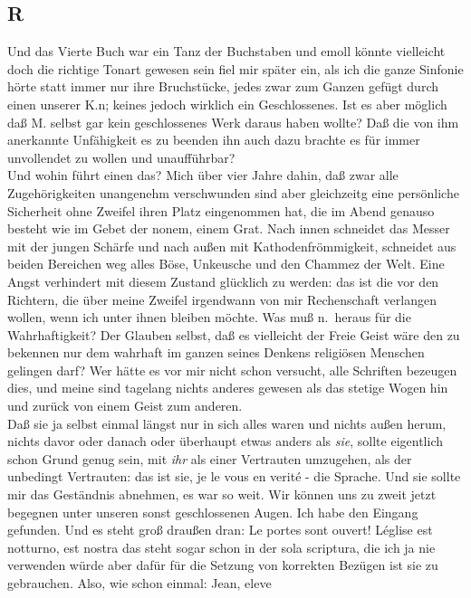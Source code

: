 \documentclass[
]{article}
\author{}
\date{\vspace{-2.5em}}
\begin{document}
\subsection{R}\label{r}

Und das Vierte Buch war ein Tanz der Buchstaben und emoll könnte
vielleicht doch die richtige Tonart gewesen sein fiel mir später ein,
als ich die ganze Sinfonie hörte statt immer nur ihre Bruchstücke, jedes
zwar zum Ganzen gefügt durch einen unserer K.n; keines jedoch wirklich
ein Geschlossenes. Ist es aber möglich daß M. selbst gar kein
geschlossenes Werk daraus haben wollte? Daß die von ihm anerkannte
Unfähigkeit es zu beenden ihn auch dazu brachte es für immer unvollendet
zu wollen und unaufführbar?\\
Und wohin führt einen das? Mich über vier Jahre dahin, daß zwar alle
Zugehörigkeiten unangenehm verschwunden sind aber gleichzeitg eine
persönliche Sicherheit ohne Zweifel ihren Platz eingenommen hat, die im
Abend genauso besteht wie im Gebet der nonem, einem Grat. Nach innen
schneidet das Messer mit der jungen Schärfe und nach außen mit
Kathodenfrömmigkeit, schneidet aus beiden Bereichen weg alles Böse,
Unkeusche und den Chammez der Welt. Eine Angst verhindert mit diesem
Zustand glücklich zu werden: das ist die vor den Richtern, die über
meine Zweifel irgendwann von mir Rechenschaft verlangen wollen, wenn ich
unter ihnen bleiben möchte. Was muß n.~heraus für die Wahrhaftigkeit?
Der Glauben selbst, daß es vielleicht der Freie Geist wäre den zu
bekennen nur dem wahrhaft im ganzen seines Denkens religiösen Menschen
gelingen darf? Wer hätte es vor mir nicht schon versucht, alle Schriften
bezeugen dies, und meine sind tagelang nichts anderes gewesen als das
stetige Wogen hin und zurück von einem Geist zum anderen.\\
Daß sie ja selbst einmal längst nur in sich alles waren und nichts außen
herum, nichts davor oder danach oder überhaupt etwas anders als
\emph{sie}, sollte eigentlich schon Grund genug sein, mit \emph{ihr} als
einer Vertrauten umzugehen, als der unbedingt Vertrauten: das ist sie,
je le vous en verité - die Sprache. Und sie sollte mir das Geständnis
abnehmen, es war so weit. Wir können uns zu zweit jetzt begegnen unter
unseren sonst geschlossenen Augen. Ich habe den Eingang gefunden. Und es
steht groß draußen dran: Le portes sont ouvert! L\textquotesingle église
est notturno, est nostra das steht sogar schon in der sola scriptura,
die ich ja nie verwenden würde aber dafür für die Setzung von korrekten
Bezügen ist sie zu gebrauchen. Also, wie schon einmal: Jean, eleve
\end{document}

